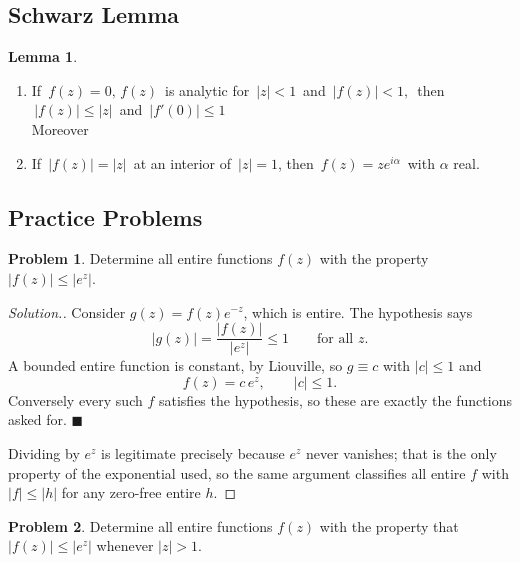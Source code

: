 \documentclass[11pt,a4paper]{article}
\theoremstyle{definition}
\newtheorem{lem}[thm]{Lemma}
\newtheorem{problemx}{Problem}[section]
\newenvironment{problem}{\begin{problemx}}{\end{problemx}}
\newenvironment{solution}
  {\renewcommand{\qedsymbol}{}\begin{proof}[\textit{Solution}.]}
  {\end{proof}}
\begin{document}
{\color[wave]{485}\subsection{Schwarz Lemma}}
\begin{lem}
\begin{enumerate}
\item[i.] If $\, f(z) = 0,\, f(z)\,$ is analytic for $\,\left|z\right| < 1\,$ and $\, \left|f(z)\right|< 1,\,$ then $\, \left|f(z)\right|\leq \left|z\right|\,$ and $\, \left|f'(0)\right|\leq 1$\\

Moreover
\item[ii.] If $\, \left|f(z)\right|    = \left|z\right|\,$ at an interior of $\, \left|z\right| = 1$, then $\, f(z)  = ze^{i\alpha}\,$ with $\alpha$ real.
\end{enumerate}
\end{lem}











{\color[wave]{485}\subsection{Practice Problems}}

\begin{problem}
Determine all entire functions $f(z)$ with the property
$\left|f(z)\right| \leq \left|e^{z}\right|$.
\end{problem}

\begin{solution}
Consider $g(z) = f(z)e^{-z}$, which is entire. The hypothesis says
$$\left|g(z)\right| = \frac{\left|f(z)\right|}{\left|e^{z}\right|} \leq 1
\qquad\text{for all } z .$$
A bounded entire function is constant, by Liouville, so $g \equiv c$ with
$\left|c\right| \leq 1$ and
$$\boxed{f(z) = c\,e^{z},\qquad \left|c\right| \leq 1 .}$$
Conversely every such $f$ satisfies the hypothesis, so these are exactly the
functions asked for. $\blacksquare$

Dividing by $e^{z}$ is legitimate precisely because $e^{z}$ never vanishes; that is
the only property of the exponential used, so the same argument classifies all
entire $f$ with $\left|f\right| \leq \left|h\right|$ for any zero-free entire $h$.
\end{solution}


\begin{problem}
Determine all entire functions $f(z)$ with the property that
$\left|f(z)\right| \leq \left|e^{z}\right|$ whenever $\left|z\right| > 1$.
\end{problem}
\end{document}
